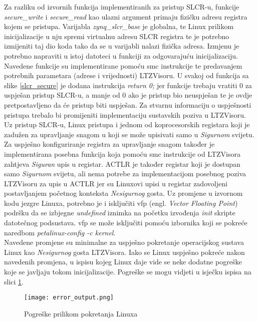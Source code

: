 \documentclass[times, utf8, diplomski, numeric]{fer}
\begin{document}
Za razliku od izvornih funkcija implementiranih za pristup SLCR-u, funkcije \textit{secure\_write} i \textit{secure\_read} kao
ulazni argument primaju fizičku adresu registra kojem se pristupa. Varijabla \textit{zynq\_slcr\_base} je globalna, te Linux
prilikom inicijalizacije u nju spremi virtualnu adresu SLCR registra te je potrebno izmijeniti taj dio koda tako da se u
varijabli nalazi fizička adresa. Izmjenu je potrebno napraviti u istoj datoteci u funkciji za odgovarajuću inicijalizaciju.
Navedene funkcije su implementirane pomoću \gls{smc} instrukcije te predavanjem potrebnih parametara (adrese i vrijednosti) LTZVisoru.
U svakoj od funkcija sa slike \ref{slcr_secure} je dodana instrukcija \textit{return 0;} jer funkcije trebaju vratiti 0 za
uspješan pristup SLCR-u, a manje od 0 ako je pristup bio neuspješan te je ovdje pretpostavljeno da će pristup biti uspješan.
Za stvarnu informaciju o uspješnosti pristupa trebalo bi promijeniti implementaciju sustavskih poziva u LTZVisoru.
Uz pristup SLCR-u, Linux pristupa i jednom od koprocesorskih registara koji je zadužen za upravljanje snagom u koji se može
upisivati samo u \textit{Sigurnom} svijetu. Za uspješno konfiguriranje registra za upravljanje snagom također je implementirana posebna
funkcija koja pomoću \gls{smc} instrukcije od LTZVisora zahtjeva \textit{Siguran} upis u registar. ACTLR je također registar koji je dostupan
samo \textit{Sigurnom} svijetu, ali nema potrebe za implementacijom posebnog poziva LTZVisoru za upis u ACTLR jer su Linuxovi upisi u
registar zadovoljeni postavljanjem početnog konteksta \textit{Nesigurnog} gosta.
Uz promjene u izvornom kodu jezgre Linuxa, potrebno je i isključiti \gls{vfp} (engl. \textit{Vector Floating Point}) podršku da se
izbjegne \textit{undefined} iznimka na početku izvođenja \textit{init} skripte datotečnog podsustava. \gls{vfp} se može isključiti
pomoću izbornika koji se pokreće naredbom \textit{petalinux-config -c kernel}.\\
Navedene promjene su minimalne za uspješno pokretanje operacijskog sustava Linux kao \textit{Nesigurnog} gosta LTZVisora. Iako se Linux
uspješno pokreće nakon navedenih promjena, u ispisu kojeg Linux daje vide se neke dodatne pogreške koje se javljaju tokom
inicijalizacije. Pogreške se mogu vidjeti u isječku ispisa na slici \ref{plnx_errors}.

\begin{figure}[H]
  \centering
  \texttt{[image: error\_output.png]}
  \caption{Pogreške prilikom pokretanja Linuxa}
  \label{plnx_errors}
\end{figure}
\end{document}
